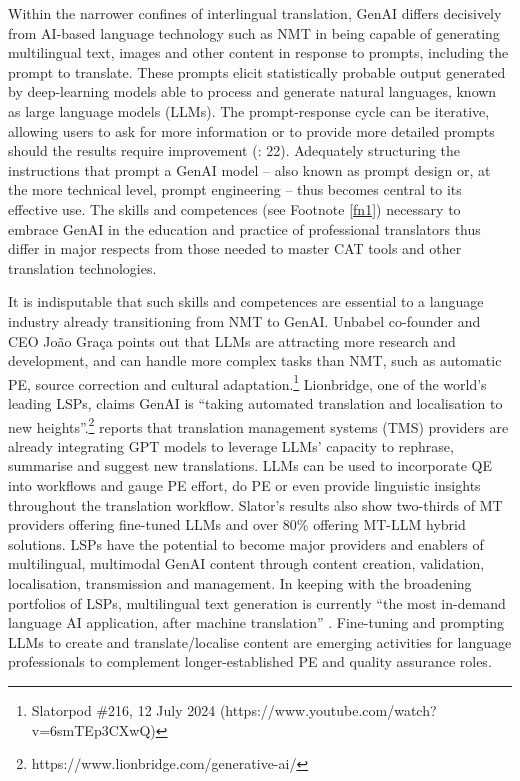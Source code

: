 \documentclass[output=paper]{langscibook}
\begin{document}
Within the narrower confines of interlingual translation, GenAI differs decisively from AI-based language technology such as NMT in being capable of generating multilingual text, images and other content in response to prompts, including the prompt to translate. These prompts elicit statistically probable output generated by deep-learning models able to process and generate natural languages, known as large language models (LLMs). The prompt-response cycle can be iterative, allowing users to ask for more information or to provide more detailed prompts should the results require improvement (\citealt{gimpel_unlocking_2023}: 22). Adequately structuring the instructions that prompt a GenAI model – also known as prompt design or, at the more technical level, prompt engineering – thus becomes central to its effective use. The skills and competences (see Footnote \ref{fn1}) necessary to embrace GenAI in the education and practice of professional translators thus differ in major respects from those needed to master CAT tools and other translation technologies. 

It is indisputable that such skills and competences are essential to a language industry already transitioning from NMT to GenAI. Unbabel co-founder and CEO João Graça points out that LLMs are attracting more research and development, and can handle more complex tasks than NMT, such as automatic PE, source correction and cultural adaptation.\footnote{ \textrm{Slatorpod \#216, 12 July 2024 (https://www.youtube.com/watch?v=6smTEp3CXwQ)}} Lionbridge, one of the world’s leading LSPs, claims GenAI is “taking automated translation and localisation to new heights”.\footnote{ \textrm{https://www.lionbridge.com/generative-ai/}} \citet[52]{slator_slator_2024} reports that translation management systems (TMS) providers are already integrating GPT models to leverage LLMs’ capacity to rephrase, summarise and suggest new translations. LLMs can be used to incorporate QE into workflows and gauge PE effort, do PE or even provide linguistic insights throughout the translation workflow. Slator’s results also show two-thirds of MT providers offering fine-tuned LLMs and over 80\% offering MT-LLM hybrid solutions. LSPs have the potential to become major providers and enablers of multilingual, multimodal GenAI content through content creation, validation, localisation, transmission and management. In keeping with the broadening portfolios of LSPs, multilingual text generation is currently “the most in-demand language AI application, after machine translation” \citep[74]{slator_slator_2024}. Fine-tuning and prompting LLMs to create and translate/localise content are emerging activities for language professionals to complement longer-established PE and quality assurance roles.
\end{document}
